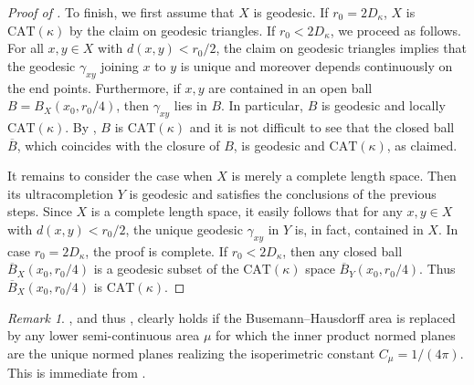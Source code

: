 \documentclass[a4paper,leqno]{amsart}
\numberwithin{equation}{section}
\theoremstyle{remark}
\newtheorem{remark}[theorem]{Remark}
\theoremstyle{remark}
\begin{document}
\begin{proof}[Proof of ]
    To finish, we first assume that $X$ is geodesic. If $r_0 = 2 D_\kappa$, $X$ is $\mathrm{CAT}(\kappa)$ by the claim on geodesic triangles. If $r_0 < 2D_\kappa$, we proceed as follows. For all $x, y \in X$ with $d(x,y) < r_0/2$, the claim on geodesic triangles implies that the geodesic $\gamma_{xy}$ joining $x$ to $y$ is unique and moreover depends continuously on the end points. Furthermore, if $x, y$ are contained in an open ball $B = B_{X}( x_0, r_0/4 )$, then $\gamma_{xy}$ lies in $B$. In particular, $B$ is geodesic and locally $\mathrm{CAT}(\kappa)$. By \cite[Radial Lemma, Lemma 9.52]{alexander-kapovitch-petrunin-2024-alexandrov-geometry-foundations}, $B$ is $\mathrm{CAT}(\kappa)$ and it is not difficult to see that the closed ball $\overline{B}$, which coincides with the closure of $B$, is geodesic and $\mathrm{CAT}(\kappa)$, as claimed.

    It remains to consider the case when $X$ is merely a complete length space. Then its ultracompletion $Y$ is geodesic and satisfies the conclusions of the previous steps. Since $X$ is a complete length space, it easily follows that for any $x,y \in X$ with $d(x,y) < r_0/2$, the unique geodesic $\gamma_{xy}$ in $Y$ is, in fact, contained in $X$. In case $r_0 = 2D_\kappa$, the proof is complete. If $r_0 < 2D_\kappa$, then any closed ball $\overline{B}_{X}( x_0, r_0/4 )$ is a geodesic subset of the $\mathrm{CAT}(\kappa)$ space $\overline{B}_{Y}( x_0, r_0/4 )$. Thus $\overline{B}_{X}( x_0, r_0/4 )$ is $\mathrm{CAT}(\kappa)$.
\end{proof}

\begin{remark}
, and thus , clearly holds if the Busemann--Hausdorff area is replaced by any lower semi-continuous area $\mu$ for which the inner product normed planes are the unique normed planes realizing the isoperimetric constant $C_\mu = 1/(4\pi)$. This is immediate from .%
\end{remark}
\end{document}
